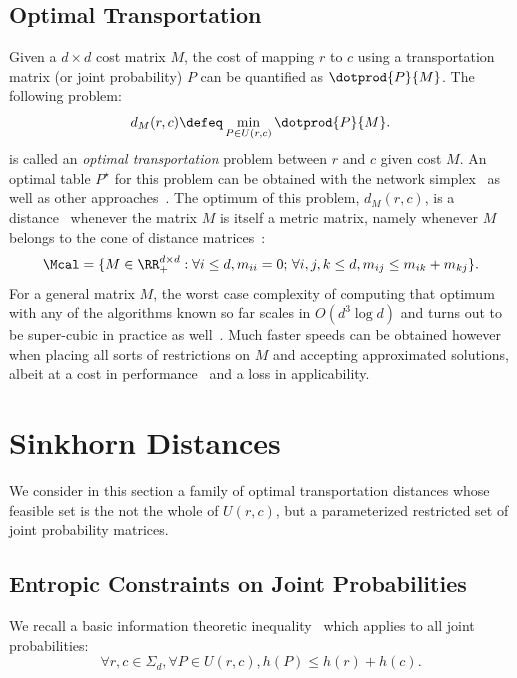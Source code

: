 \documentclass{amsart} %
\begin{document}
\subsection{Optimal Transportation} Given a $d\times d$ cost matrix $M$, the cost of mapping $r$ to $c$ using a transportation matrix (or joint probability) $P$ can be quantified  as $\dotprod{P}{M}$. The following problem:
$$
d_M(r,c) \defeq \min_{P\in U(r,c)} \dotprod{P}{M}.
$$
is called an \emph{optimal transportation} problem between $r$ and $c$ given cost $M$. An optimal table $P^\star$ for this problem can be obtained with the network simplex~\citep[\S9]{ahuja1993network} as well as other approaches~\citep{orlin1993faster}. The optimum of this problem, $d_M(r,c)$, is a distance~\citep[\S6.1]{villani09} whenever the matrix $M$ is itself a metric matrix, namely whenever $M$ belongs to the cone of distance matrices~\citep{avis1980extreme,brickell2008metric}:
$$\Mcal=\{M\in\RR^{d\times d}_+:\forall i\leq d, m_{ii}=0;\, \forall i,j,k\leq d, m_{ij}\leq m_{ik} + m_{kj}\}.$$
For a general matrix $M$, the worst case complexity of computing that optimum with any of the algorithms known so far scales in $O(d^3\log d)$ and turns out to be super-cubic in practice as well~\citep[\S2.1]{Pele-iccv2009}. Much faster speeds can be obtained however when placing all sorts of restrictions on $M$ and accepting approximated solutions, albeit at a cost in performance~\citep{GraumanD04} and a loss in applicability.


\section{Sinkhorn Distances}\label{sec:grav}
We consider in this section a family of optimal transportation distances whose feasible set is the not the whole of $U(r,c)$, but a parameterized restricted set of joint probability matrices.

\subsection{Entropic Constraints on Joint Probabilities}
We recall a basic information theoretic inequality~\citep[\S2]{cover91elements} which applies to all joint probabilities: 
\begin{equation}\label{eq:basic}
	\forall r,c \in \Sigma_d, \forall P\in U(r,c), h(P) \leq h(r)+h(c).
\end{equation}
\end{document}
